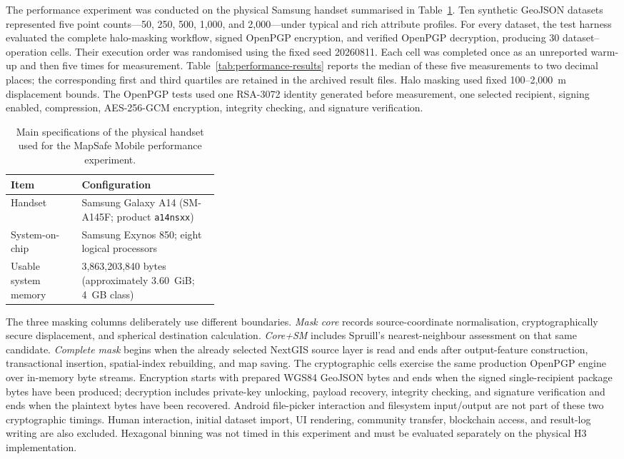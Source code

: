 \documentclass[a4paper,UKenglish,cleveref,autoref,thm-restate]{lipics-v2021}
\begin{document}
The performance experiment was conducted on the physical Samsung handset summarised in Table~\ref{tab:performance-device}. Ten synthetic GeoJSON datasets represented five point counts---50, 250, 500, 1,000, and 2,000---under typical and rich attribute profiles. For every dataset, the test harness evaluated the complete halo-masking workflow, signed OpenPGP encryption, and verified OpenPGP decryption, producing 30 dataset--operation cells. Their execution order was randomised using the fixed seed 20260811. Each cell was completed once as an unreported warm-up and then five times for measurement. Table~\ref{tab:performance-results} reports the median of these five measurements to two decimal places; the corresponding first and third quartiles are retained in the archived result files. Halo masking used fixed 100--2,000~m displacement bounds. The OpenPGP tests used one RSA-3072 identity generated before measurement, one selected recipient, signing enabled, compression, AES-256-GCM encryption, integrity checking, and signature verification.

\begin{table}[t]
\centering
\caption{Main specifications of the physical handset used for the MapSafe Mobile performance experiment.}
\label{tab:performance-device}
\small
\begin{tabularx}{\linewidth}{p{0.34\linewidth}X}
\toprule
\textbf{Item} & \textbf{Configuration} \\
\midrule
Handset & Samsung Galaxy A14 (SM-A145F; product \texttt{a14nsxx}) \\
System-on-chip & Samsung Exynos 850; eight logical processors \\
Usable system memory & 3,863,203,840 bytes (approximately 3.60~GiB; 4~GB class) \\
\bottomrule
\end{tabularx}
\end{table}

The three masking columns deliberately use different boundaries. \emph{Mask core} records source-coordinate normalisation, cryptographically secure displacement, and spherical destination calculation. \emph{Core+SM} includes Spruill's nearest-neighbour assessment on that same candidate. \emph{Complete mask} begins when the already selected NextGIS source layer is read and ends after output-feature construction, transactional insertion, spatial-index rebuilding, and map saving. The cryptographic cells exercise the same production OpenPGP engine over in-memory byte streams. Encryption starts with prepared WGS84 GeoJSON bytes and ends when the signed single-recipient package bytes have been produced; decryption includes private-key unlocking, payload recovery, integrity checking, and signature verification and ends when the plaintext bytes have been recovered. Android file-picker interaction and filesystem input/output are not part of these two cryptographic timings. Human interaction, initial dataset import, UI rendering, community transfer, blockchain access, and result-log writing are also excluded. Hexagonal binning was not timed in this experiment and must be evaluated separately on the physical H3 implementation.
\end{document}
